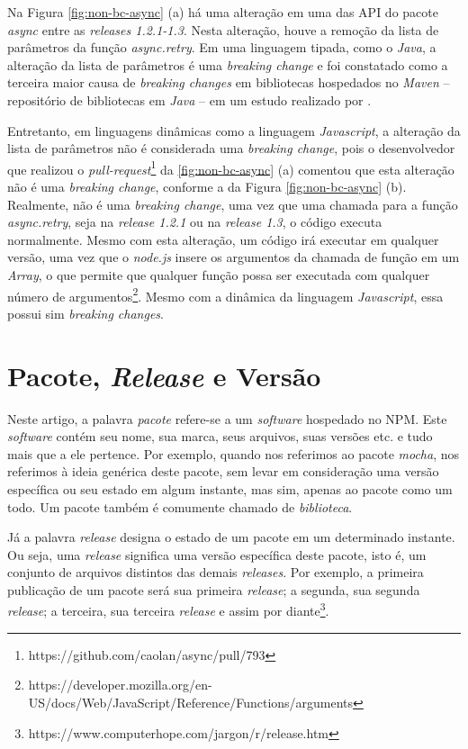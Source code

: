 Na Figura \ref{fig:non-bc-async} (a) há uma alteração em uma das \gls{API} do pacote \textit{async} entre as \textit{releases 1.2.1-1.3}. Nesta alteração, houve a remoção da lista de parâmetros da função \textit{async.retry}. Em uma linguagem tipada, como o \textit{Java}, a alteração da lista de parâmetros é uma \textit{breaking change} e foi constatado como a terceira maior causa de \textit{breaking changes} em bibliotecas hospedados no \textit{Maven} -- repositório de bibliotecas em \textit{Java} -- em um estudo realizado por .

Entretanto, em linguagens dinâmicas como a linguagem \textit{Javascript}, a alteração da lista de parâmetros não é considerada uma \textit{breaking change}, pois o desenvolvedor que realizou o \textit{pull-request}\footnote{https://github.com/caolan/async/pull/793} da \ref{fig:non-bc-async} (a) comentou que esta alteração não é uma \textit{breaking change}, conforme a da Figura \ref{fig:non-bc-async} (b). Realmente, não é uma \textit{breaking change}, uma vez que uma chamada para a função \textit{async.retry}, seja na \textit{release 1.2.1} ou na \textit{release 1.3}, o código executa normalmente. Mesmo com esta alteração, um código irá executar em qualquer versão, uma vez que o \textit{node.js} insere os argumentos da chamada de função em um \textit{Array}, o que permite que qualquer função possa ser executada com qualquer número de argumentos\footnote{https://developer.mozilla.org/en-US/docs/Web/JavaScript/Reference/Functions/arguments}. Mesmo com a dinâmica da linguagem \textit{Javascript}, essa possui sim \textit{breaking changes}.

\section{Pacote, \textit{Release} e Versão}
\label{ref-teo:release}
Neste artigo, a palavra \textit{pacote} refere-se a um \textit{software} hospedado no \gls{NPM}. Este \textit{software} contém seu nome, sua marca, seus arquivos, suas versões etc. e tudo mais que a ele pertence. Por exemplo, quando nos referimos ao pacote \textit{mocha}, nos referimos à ideia genérica deste pacote, sem levar em consideração uma versão específica ou seu estado em algum instante, mas sim, apenas ao pacote como um todo. Um pacote também é comumente chamado de \textit{biblioteca}.

Já a palavra \textit{release} designa o estado de um pacote em um determinado instante. Ou seja, uma \textit{release} significa uma versão específica deste pacote, isto é, um conjunto de arquivos distintos das demais \textit{releases}. Por exemplo, a primeira publicação de um pacote será sua primeira \textit{release}; a segunda, sua segunda \textit{release}; a terceira, sua terceira \textit{release} e assim por diante\footnote{https://www.computerhope.com/jargon/r/release.htm}.

